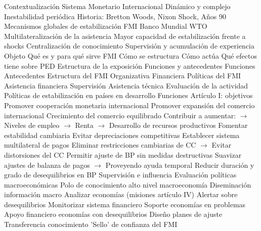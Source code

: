 \documentclass{nuevotema}
\begin{document}
\esquemalargo













\begin{esquemal}
	\1[] 
		\2 Contextualización
			\3 Sistema Monetario Internacional
				\4 Dinámico y complejo
				\4 Inestabilidad periódica
				\4 Historia: Bretton Woods, Nixon Shock, Años 90
			\3 Mecanismos globales de estabilización
				\4 FMI
				\4 Banco Mundial
				\4 WTO
			\3 Multilateralización de la asistencia
				\4 Mayor capacidad de estabilización frente a shocks
				\4 Centralización de conocimiento
				\4 Supervisión y acumulación de experiencia
		\2 Objeto
			\3 Qué es y para qué sirve FMI
			\3 Cómo se estructura
			\3 Cómo actúa
			\3 Qué efectos tiene sobre PED
		\2 Estructura de la exposición
			\3 Funciones y antecedentes
				\4 Funciones
				\4 Antecedentes
			\3 Estructura del FMI
				\4 Organizativa
				\4 Financiera
			\3 Políticas del FMI
				\4 Asistencia financiera
				\4 Supervisión
				\4 Asistencia técnica
				\4 Evaluación de la actividad
			\3 Políticas de estabilización en países en desarrollo
	\1 
		\2 Funciones
			\3 Artículo I: objetivos
				\4[i] Promover cooperación monetaria internacional
				\4[ii] Promover expansión del comercio internacional
				\4[] Crecimiento del comercio equilibrado
				\4[] Contribuir a aumentar:
				\4[] $\to$ Niveles de empleo
				\4[] $\to$ Renta
				\4[] $\to$ Desarrollo de recursos productivos
				\4[iii] Fomentar estabilidad cambiaria
				\4[] Evitar depreciaciones competitivas
				\4[iv] Establecer sistema multilateral de pagos
				\4[] Eliminar restricciones cambiarias de CC
				\4[] $\to$ Evitar distorsiones del CC
				\4[v] Permitir ajuste de BP sin medidas destructivas
				\4[] Suavizar ajustes de balanza de pagos
				\4[] $\to$ Proveyendo ayuda temporal
				\4[vi] Reducir duración y grado de desequilibrios en BP
			\3 Supervisión e influencia
				\4 Evaluación políticas macroeconómicas
				\4 Polo de conocimiento alto nivel macroeconomía
				\4 Diseminación información macro
				\4 Analizar economías (misiones artículo IV)
				\4[] Alertar sobre desequilibrios
				\4[] Monitorizar sistema financiero
			\3 Soporte economías en problemas
				\4 Apoyo financiero economías con desequilibrios
				\4 Diseño planes de ajuste
				\4 Transferencia conocimiento
				\4 'Sello' de confianza del FMI

\end{esquemal}
\end{document}
